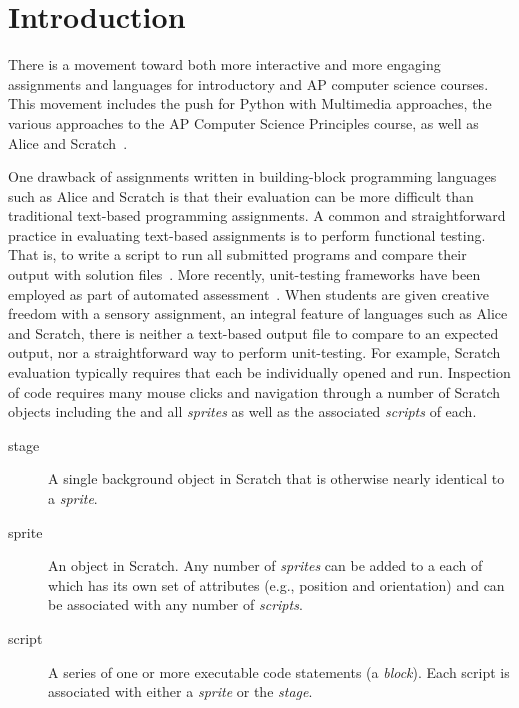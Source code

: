 \section{Introduction}
There is a movement toward both more interactive and more engaging assignments
and languages for introductory and AP computer science courses. This movement
includes the push for Python with Multimedia approaches, the various approaches
to the AP Computer Science Principles course, as well as Alice and
Scratch~\cite{Adams:2012:SLP:2157136.2157319, Forte:2004:CCC:962752.962945,
  Simon:2010:ERC:1822090.1822151, Snyder:2012:FFC:2189835.2189852,
  Cooper:2003:TOI:611892.611966, Maloney:2010:SPL:1868358.1868363}.

One drawback of assignments written in building-block programming languages
such as Alice and Scratch is that their evaluation can be more difficult than
traditional text-based programming assignments.  A common and straightforward
practice in evaluating text-based assignments is to perform functional
testing. That is, to write a script to run all submitted programs and compare
their output with solution files~\cite{Jackson:1997:GSP:268084.268210}.  More
recently, unit-testing frameworks have been employed as part of automated
assessment~\cite{Spacco:2006:EMD:1140124.1140131,
  Edwards:2003:RCS:949344.949390}.  When students are given creative freedom
with a sensory assignment, an integral feature of languages such as Alice and
Scratch, there is neither a text-based output file to compare to an expected
output, nor a straightforward way to perform unit-testing.  For example,
Scratch evaluation typically requires that each \sprogram{} be individually
opened and run.  Inspection of \sprogram{} code requires many mouse clicks and
navigation through a number of Scratch objects including the \stage{} and all
\emph{sprites} as well as the associated \emph{scripts} of each.

\begin{description}
\item[stage] A single background object in Scratch that is otherwise nearly
  identical to a \emph{sprite}.
\item[sprite] An object in Scratch. Any number of \emph{sprites} can be added
  to a \sprogram{} each of which has its own set of attributes (e.g., position
  and orientation) and can be associated with any number of \emph{scripts}.
\item[script] A series of one or more executable code statements (a
  \emph{block}). Each script is associated with either a \emph{sprite} or the
  \emph{stage}.
\end{description}

